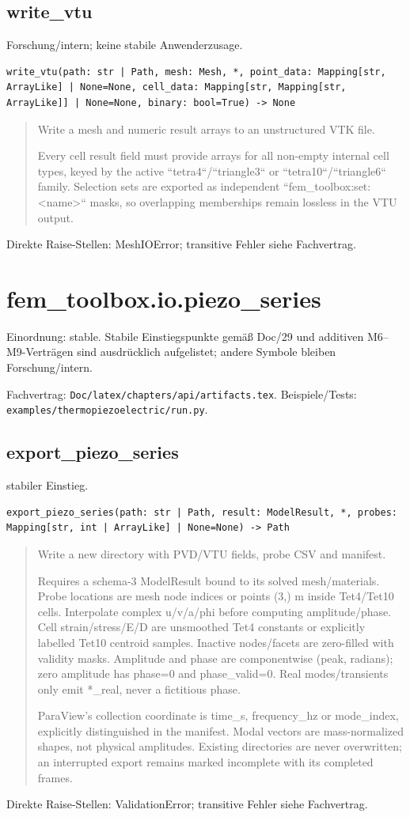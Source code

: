 \subsection{write\_vtu}
Forschung/intern; keine stabile Anwenderzusage.
\begin{lstlisting}
write_vtu(path: str | Path, mesh: Mesh, *, point_data: Mapping[str, ArrayLike] | None=None, cell_data: Mapping[str, Mapping[str, ArrayLike]] | None=None, binary: bool=True) -> None
\end{lstlisting}
\begin{quote}
Write a mesh and numeric result arrays to an unstructured VTK file.\par Every cell result field must provide arrays for all non-empty internal cell types, keyed by the active ``tetra4``/``triangle3`` or ``tetra10``/``triangle6`` family. Selection sets are exported as independent ``fem\_toolbox:set:<name>`` masks, so overlapping memberships remain lossless in the VTU output.
\end{quote}
Direkte Raise-Stellen: MeshIOError; transitive Fehler siehe Fachvertrag.
\section{fem\_toolbox.io.piezo\_series}
Einordnung: stable. Stabile Einstiegspunkte gemäß Doc/29 und additiven M6–M9-Verträgen sind ausdrücklich aufgelistet; andere Symbole bleiben Forschung/intern.
\par Fachvertrag: \nolinkurl{Doc/latex/chapters/api/artifacts.tex}. Beispiele/Tests:
\nolinkurl{examples/thermopiezoelectric/run.py}.
\subsection{export\_piezo\_series}
stabiler Einstieg.
\begin{lstlisting}
export_piezo_series(path: str | Path, result: ModelResult, *, probes: Mapping[str, int | ArrayLike] | None=None) -> Path
\end{lstlisting}
\begin{quote}
Write a new directory with PVD/VTU fields, probe CSV and manifest.\par Requires a schema-3 ModelResult bound to its solved mesh/materials. Probe locations are mesh node indices or points (3,) m inside Tet4/Tet10 cells. Interpolate complex u/v/a/phi before computing amplitude/phase. Cell strain/stress/E/D are unsmoothed Tet4 constants or explicitly labelled Tet10 centroid samples. Inactive nodes/facets are zero-filled with validity masks. Amplitude and phase are componentwise (peak, radians); zero amplitude has phase=0 and phase\_valid=0. Real modes/transients only emit *\_real, never a fictitious phase.\par ParaView's collection coordinate is time\_s, frequency\_hz or mode\_index, explicitly distinguished in the manifest. Modal vectors are mass-normalized shapes, not physical amplitudes. Existing directories are never overwritten; an interrupted export remains marked incomplete with its completed frames.
\end{quote}
Direkte Raise-Stellen: ValidationError; transitive Fehler siehe Fachvertrag.
